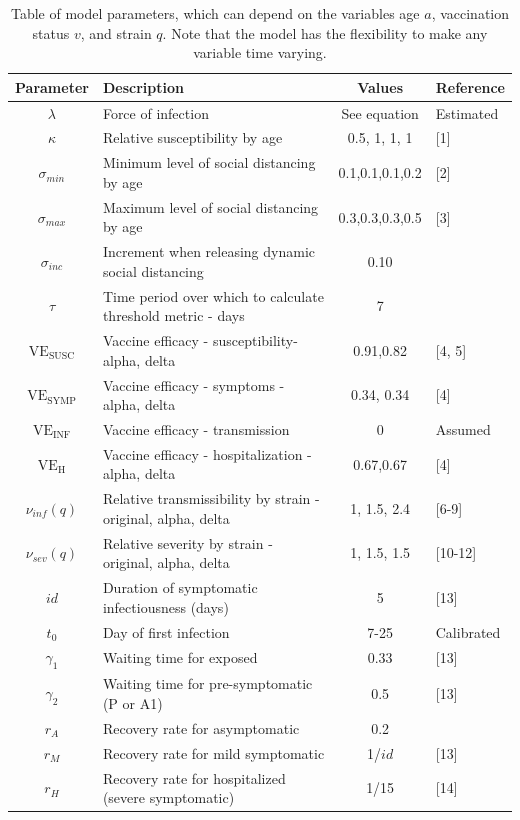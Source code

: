 \documentclass[11pt]{article}
\begin{document}
\begin{table}
\caption{Table of model parameters, which can depend on the variables age $a$, vaccination status $v$, and strain $q$. Note that the model has the flexibility to make any variable time varying.}
\label{tab:parameters}
\centering
\begin{tabular}{c l c l} 
\hline Parameter  & Description & Values & Reference \\
\hline
$\lambda$ & Force of infection      & See equation & Estimated   \\
$\kappa$ & Relative susceptibility by age & 0.5, 1, 1, 1 & [1] \\
$\sigma_{min}$ & Minimum level of social distancing by age &  0.1,0.1,0.1,0.2 & [2]\\
$\sigma_{max}$ &  Maximum level of social distancing by age & 0.3,0.3,0.3,0.5 & [3]\\
$\sigma_{inc}$ & Increment when releasing dynamic social distancing    & 0.10 &    \\
$\tau$ & Time period over which to calculate threshold metric - days   &  7 &    \\
$\mathrm{VE_{SUSC}}$ & Vaccine efficacy - susceptibility- alpha, delta & 0.91,0.82   & [4, 5]\\
$\mathrm{VE_{SYMP}}$ & Vaccine efficacy - symptoms - alpha, delta& 0.34, 0.34   &  [4]   \\
$\mathrm{VE_{INF}}$ & Vaccine efficacy - transmission  & 0 & Assumed   \\
$\mathrm{VE_{H}}$ & Vaccine efficacy - hospitalization - alpha, delta  & 0.67,0.67 & [4]  \\
$\nu_{inf}(q)$ &Relative transmissibility by strain - original, alpha, delta & 1, 1.5, 2.4 & [6-9]\\
$\nu_{sev}(q)$ & Relative severity by strain - original, alpha, delta & 1, 1.5, 1.5 & [10-12]\\
$ id $ & Duration of symptomatic infectiousness (days) & 5 & [13] \\
$t_0$ & Day of first infection  & 7-25 & Calibrated   \\
$\gamma_1$ &  Waiting time for exposed  &0.33 & [13] \\
$\gamma_2$ &  Waiting time for pre-symptomatic (P or A1) &   0.5 &  [13] \\
$r_A$ &  Recovery rate for asymptomatic  & 0.2 & \\
$r_M$ &  Recovery rate for mild symptomatic  & 1/$id$ &  [13] \\
$r_H$ &  Recovery rate for hospitalized (severe symptomatic)  &   1/15 & [14]\\

\end{tabular}
\end{table}
\end{document}
